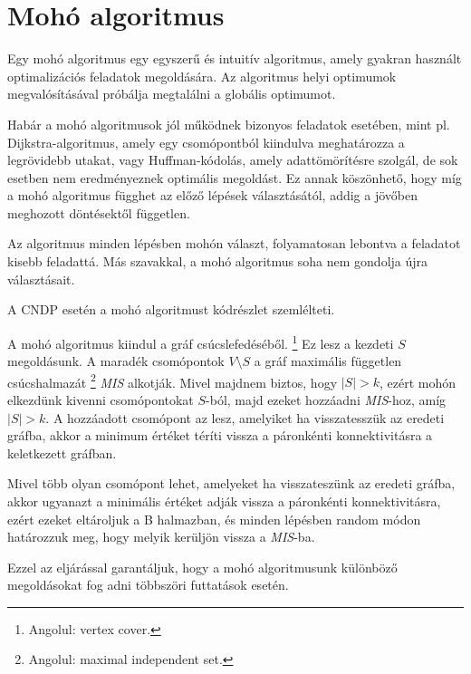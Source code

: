 \section{Mohó algoritmus}\label{sec:MOHO_ALGORITMUS}

Egy mohó algoritmus egy egyszerű és intuitív algoritmus, amely gyakran használt
optimalizációs feladatok megoldására. Az algoritmus helyi optimumok megvalósításával próbálja
megtalálni a globális optimumot.

Habár a mohó algoritmusok jól működnek bizonyos feladatok esetében,
mint pl. Dijkstra-algoritmus, amely egy csomópontból kiindulva meghatározza a legrövidebb utakat,
vagy Huffman-kódolás, amely adattömörítésre szolgál, de sok esetben nem eredményeznek optimális megoldást.
Ez annak köszönhető, hogy míg a mohó algoritmus függhet az előző lépések választásától,
addig a jövőben meghozott döntésektől független.

Az algoritmus minden lépésben mohón választ, folyamatosan lebontva a feladatot kisebb feladattá.
Más szavakkal, a mohó algoritmus soha nem gondolja újra választásait.

A CNDP esetén a mohó algoritmust  kódrészlet szemlélteti.


A mohó algoritmus kiindul a gráf csúcslefedéséből.
\footnote{
  Angolul: vertex cover.
}
Ez lesz a kezdeti $S$ megoldásunk.
A maradék csomópontok $V \setminus S$  a gráf maximális független csúcshalmazát
\footnote{
  Angolul: maximal independent set.
}
\emph{MIS} alkotják.
Mivel majdnem biztos, hogy $|S| > k$, ezért mohón elkezdünk kivenni csomópontokat $S$-ból,
majd ezeket hozzáadni \emph{MIS}-hoz, amíg $|S| > k$.
A hozzáadott csomópont az lesz, amelyiket ha visszatesszük az eredeti gráfba,
akkor a minimum értéket téríti vissza a páronkénti konnektivitásra a keletkezett gráfban.

Mivel több olyan csomópont lehet, amelyeket ha visszateszünk az eredeti gráfba,
akkor ugyanazt a minimális értéket adják vissza a páronkénti konnektivitásra,
ezért ezeket eltároljuk a B halmazban, és minden lépésben random módon határozzuk meg,
hogy melyik kerüljön vissza a \emph{MIS}-ba.

Ezzel az eljárással garantáljuk, hogy a mohó algoritmusunk különböző megoldásokat fog adni
többszöri futtatások esetén.
